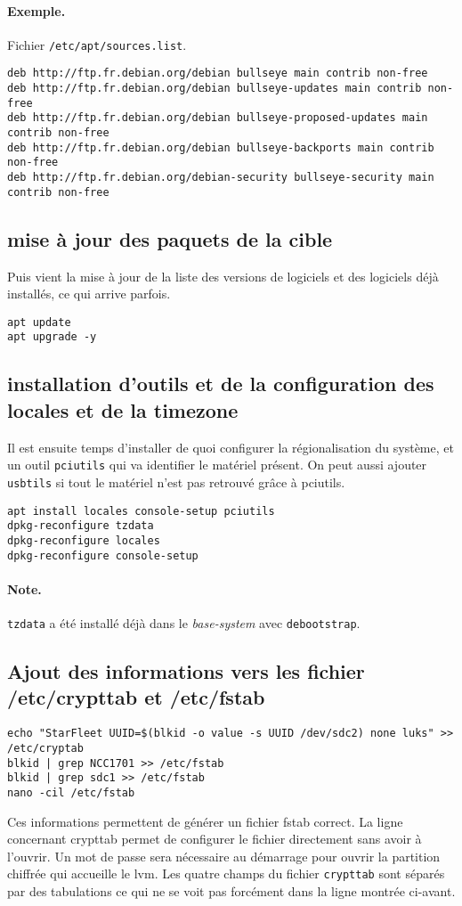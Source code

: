 \documentclass[12pt, a4paper]{article}
\begin{document}
\paragraph{Exemple.} Fichier \texttt{/etc/apt/sources.list}.
\begin{verbatim}
deb http://ftp.fr.debian.org/debian bullseye main contrib non-free
deb http://ftp.fr.debian.org/debian bullseye-updates main contrib non-free
deb http://ftp.fr.debian.org/debian bullseye-proposed-updates main contrib non-free
deb http://ftp.fr.debian.org/debian bullseye-backports main contrib non-free
deb http://ftp.fr.debian.org/debian-security bullseye-security main contrib non-free
\end{verbatim}

\subsection{mise à jour des paquets de la cible}
Puis vient la mise à jour de la liste des versions de logiciels et des logiciels déjà installés, ce qui arrive parfois.
\begin{verbatim}
apt update
apt upgrade -y
\end{verbatim}

\subsection{installation d'outils et de la configuration des locales et de la timezone}
Il est ensuite temps d'installer de quoi configurer la régionalisation du système, et un outil \texttt{pciutils} qui va identifier le matériel présent. 
On peut aussi ajouter \texttt{usbtils} si tout le matériel n'est pas retrouvé grâce à pciutils. 
\begin{verbatim}
apt install locales console-setup pciutils
dpkg-reconfigure tzdata
dpkg-reconfigure locales
dpkg-reconfigure console-setup
\end{verbatim}
\paragraph{Note.} \texttt{tzdata} a été installé déjà dans le \emph{base-system} avec \texttt{debootstrap}.

\subsection{Ajout des informations vers les fichier /etc/crypttab et /etc/fstab}
\begin{verbatim}
echo "StarFleet UUID=$(blkid -o value -s UUID /dev/sdc2) none luks" >> /etc/cryptab
blkid | grep NCC1701 >> /etc/fstab
blkid | grep sdc1 >> /etc/fstab
nano -cil /etc/fstab
\end{verbatim}
Ces informations permettent de générer un fichier fstab correct. 
La ligne concernant crypttab permet de configurer le fichier directement sans avoir à l'ouvrir. 
Un mot de passe sera nécessaire au démarrage pour ouvrir la partition chiffrée qui accueille le lvm.
Les quatre champs du fichier \texttt{crypttab} sont séparés par des tabulations ce qui ne se voit pas forcément dans la ligne montrée ci-avant.
\end{document}
